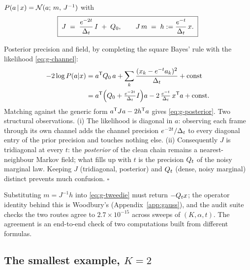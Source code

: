 \begin{proposition}\label{prop:g-posterior}
$P(a \,|\, x) = \mathcal{N}(a;\, m,\, J^{-1})$ with
\begin{equation}
  \boxed{\;
  J \;=\; \frac{e^{-2t}}{\Delta_t}\, I \;+\; Q_0 ,
  \qquad
  J\, m \;=\; h := \frac{e^{-t}}{\Delta_t}\, x .
  \;}
  \label{eq:g-posterior}
\end{equation}
\end{proposition}

\begin{toolbox}{Posterior precision and field, by completing the square}
Bayes' rule with the likelihood \eqref{eq:g-channel}:
\begin{align*}
  -2 \log P(a | x)
  &= a^{\mathsf{T}} Q_0\, a
  + \sum_{k} \frac{(x_k - e^{-t} a_k)^2}{\Delta_t}
  + \text{const} \\
  &= a^{\mathsf{T}} \Big( Q_0 + \tfrac{e^{-2t}}{\Delta_t} I \Big) a
  - 2\, \tfrac{e^{-t}}{\Delta_t}\, x^{\mathsf{T}} a
  + \text{const}.
\end{align*}
Matching against the generic form $a^{\mathsf{T}} J a - 2 h^{\mathsf{T}} a$ gives
\eqref{eq:g-posterior}. Two structural observations. (i) The likelihood is
diagonal in $a$: observing each frame through its own channel adds the
channel precision $e^{-2t}/\Delta_t$ to every diagonal entry of the prior
precision and touches nothing else. (ii) Consequently $J$ is tridiagonal
at every $t$: the \emph{posterior} of the clean chain remains a
nearest-neighbour Markov field; what fills up with $t$ is the precision
$Q_t$ of the noisy marginal law. Keeping $J$ (tridiagonal, posterior) and
$Q_t$ (dense, noisy marginal) distinct prevents much confusion.
\hfill$\square$
\end{toolbox}

Substituting $m = J^{-1} h$ into \eqref{eq:g-tweedie} must return
$-Q_t x$; the operator identity behind this is Woodbury's
(Appendix~\ref{app:gauss}), and the audit suite checks the two routes
agree to $2.7 \times 10^{-15}$ across sweeps of $(K, \alpha, t)$. The
agreement is an end-to-end check of two computations built from different
formulas.

\subsection{The smallest example, $K = 2$}\label{sec:g-K2}

